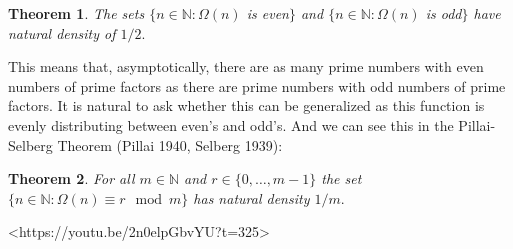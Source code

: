 \documentclass{article}
\newtheorem{theorem}{Theorem}
\begin{document}
\begin{theorem}
The sets $\{n \in \mathbb{N} : \Omega(n)$ is even$\}$ and $\{n \in \mathbb{N} : \Omega(n)$ is odd$\}$ have natural density of $1/2.$
\end{theorem}

This means that, asymptotically, there are as many prime numbers with even numbers of prime factors as there are prime numbers with odd numbers of prime factors. It is natural to ask whether this can be generalized as this function is evenly distributing between even's and odd's. And we can see this in the Pillai-Selberg Theorem (Pillai 1940, Selberg 1939):

\begin{theorem}
For all $m \in \mathbb{N}$ and $r \in \{0,\dots,m-1\}$ the set $\{n \in \mathbb{N} : \Omega(n) \equiv r \mod m\}$ has natural density $1/m.$
\end{theorem}

<https://youtu.be/2n0elpGbvYU?t=325>
\end{document}
